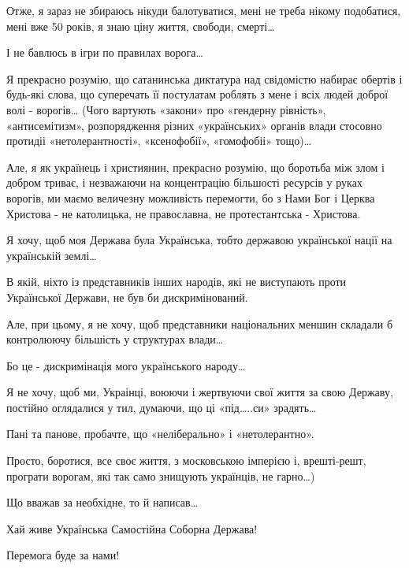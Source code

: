 Отже, я зараз не збираюсь нікуди балотуватися, мені не треба нікому подобатися,
мені вже 50 років, я знаю ціну життя, свободи, смерті… 

І не бавлюсь в ігри по правилах ворога…

Я прекрасно розумію, що сатанинська диктатура над свідомістю набирає обертів і
будь-які слова, що суперечать її постулатам роблять з мене і всіх людей доброї
волі - ворогів… (Чого вартують «закони» про «гендерну рівність»,
«антисемітизм», розпорядження різних «українських» органів влади стосовно
протидіі «нетолерантності», «ксенофобії», «гомофобіі» тощо)…

Але, я як українець і християнин, прекрасно розумію, що боротьба між злом і
добром триває, і незважаючи на концентрацію більшості  ресурсів у руках
ворогів, ми маємо величезну можливість перемогти, бо з Нами Бог і Церква
Христова - не католицька, не православна, не протестантська - Христова.

Я хочу, щоб моя Держава була Українська, тобто державою української нації на
українській землі… 

В якій, ніхто із представників інших народів, які не виступають проти
Української Держави,  не був би  дискримінований. 

Але, при цьому, я не хочу, щоб представники національних меншин складали б
контролюючу більшість у структурах влади… 

Бо це - дискримінація мого українського народу…

Я не хочу, щоб ми, Украінці, воюючи і жертвуючи свої життя за свою Державу,
постійно оглядалися у тил, думаючи, що ці «під…..си» зрадять…

Пані та панове, пробачте, що «неліберально» і «нетолерантно».

Просто, боротися, все своє життя, з московською імперією і, врешті-решт,
програти ворогам, які так само знищують українців, не гарно…)

Що вважав за необхідне, то й написав…

Хай живе Українська Самостійна Соборна Держава!

Перемога буде за нами!
